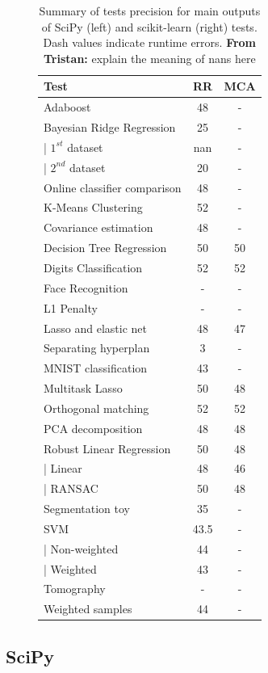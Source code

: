 \documentclass[11pt]{article}
\newcommand{\tristan}[1]{\color{orange}\textbf{From Tristan:} #1\color{black}\xspace}
\begin{document}
\begin{table}
\begin{subfigure}[t]{.5\linewidth}
\begin{tabular}{|l|c|c|}
    \hline 
    Test & RR & MCA \\
    \hline
    Adaboost & 48 & - \\
    Bayesian Ridge Regression  & 25 & -  \\
    | $1^{st}$ dataset & nan & - \\
    | $2^{nd}$ dataset & 20 & - \\
    Online classifier comparison & 48 & -  \\
    K-Means Clustering  & 52 & -   \\
    Covariance estimation  & 48 & -   \\
    Decision Tree Regression & 50 & 50  \\
    Digits Classification  & 52 & 52 \\
    Face Recognition  & - & - \\
    L1 Penalty  & - & -   \\
    Lasso and elastic net  & 48 & 47  \\
    Separating hyperplan  & 3 & -  \\
    MNIST classification  & 43 & - \\
    Multitask Lasso  & 50 & 48   \\
    Orthogonal matching & 52 & 52  \\
    PCA decomposition  & 48 & 48   \\
    Robust Linear Regression  & 50 & 48   \\
    | Linear & 48 & 46 \\
    | RANSAC & 50 & 48 \\
    Segmentation toy  & 35 & - \\
    SVM  & 43.5 &  -  \\
    | Non-weighted & 44 & - \\
    | Weighted & 43 & - \\
    Tomography  & - & -  \\
    Weighted samples  & 44 & -   \\
    \hline
    \end{tabular}
\end{subfigure}
    \caption{Summary of tests precision for main outputs of SciPy (left) and scikit-learn (right) tests. 
    Dash values indicate runtime errors. \tristan{explain the meaning of nans here}}
    \label{tab:pytracer_test_precision_summary}
\end{table}


\subsection{SciPy}
\label{sec:scipy_tests}
\end{document}
